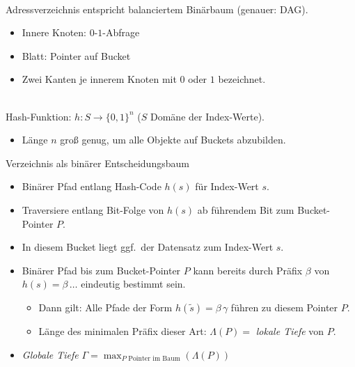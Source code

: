 \begin{frame}{\insertsection}
\framesubtitle{\insertsubsection}	
\abs
Adressverzeichnis entspricht balanciertem Bin\"arbaum (genauer: DAG).
	\begin{itemize}
		\item Innere Knoten: $0$-$1$-Abfrage 
		\item Blatt: Pointer auf Bucket
		\item Zwei Kanten je innerem Knoten mit $0$ oder $1$ bezeichnet.
	\end{itemize}
\end{frame}

\begin{frame}{\insertsection}
\framesubtitle{\insertsubsection}	
\begin{columns}[T]
	\begin{column}{.72\textwidth}
		{\small Hash-Funktion: $h: S\to \{0,1\}^n$ ($S$ Dom\"ane der Index-Werte).}
		\begin{itemize}
			\item {\small L\"ange $n$ {gro\ss} genug, um alle Objekte auf Buckets abzubilden.}
		\end{itemize}
		\pause
		{\small Verzeichnis als bin\"arer Entscheidungsbaum}
		\begin{itemize}
			\item {\small Bin\"arer Pfad entlang Hash-Code $h(s)$ f\"ur Index-Wert $s$.}
			\item {\small Traversiere entlang Bit-Folge von $h(s)$ ab f\"uhrendem Bit zum Bucket-Pointer $P$.}
			\item {\small In diesem Bucket liegt ggf.~der Datensatz zum Index-Wert $s$.}
			\pause
			\item {\small Bin\"arer Pfad bis zum Bucket-Pointer $P$ kann bereits durch Pr\"afix $\beta$ von $h(s)=\beta\,\ldots$ 
				eindeutig bestimmt sein.}
			\begin{itemize}
				\item {\small Dann gilt: Alle Pfade der Form $h(\tilde s)=\beta\,\gamma$ f\"uhren zu diesem Pointer $P$.}
				\item {\small L\"ange des minimalen Pr\"afix dieser Art: $\Lambda(P) =$ \emph{lokale Tiefe} von $P$.}
			\end{itemize}
			\pause
			\item {\small \emph{Globale Tiefe} $\Gamma =\max_{\text{$P$ Pointer im Baum}}(\Lambda(P))$}
		\end{itemize}

\end{column}
\end{columns}
\end{frame}
